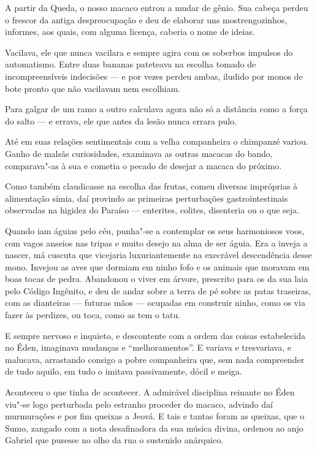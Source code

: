 A partir da Queda, o nosso macaco entrou a mudar de gênio. Sua cabeça
perdeu o frescor da antiga despreocupação e deu de elaborar uns
mostrengozinhos, informes, aos quais, com alguma licença, caberia o nome
de ideias.

Vacilava, ele que nunca vacilara e sempre agira com os soberbos impulsos
do automatismo. Entre duas bananas pateteava na escolha tomado de
incompreensíveis indecisões --- e por vezes perdeu ambas, iludido por
monos de bote pronto que não vacilavam nem escolhiam.

Para galgar de um ramo a outro calculava agora não só a distância como a
força do salto --- e errava, ele que antes da lesão nunca errara pulo.

Até em suas relações sentimentais com a velha companheira o chimpanzé
variou. Ganho de malsãs curiosidades, examinava as outras macacas do
bando, comparava"-as à sua e cometia o pecado de desejar a macaca do
próximo.

Como também claudicasse na escolha das frutas, comeu diversas impróprias
à alimentação símia, daí provindo as primeiras perturbações
gastrointestinais observadas na higidez do Paraíso --- enterites,
colites, disenteria ou o que seja.

Quando iam águias pelo céu, punha"-se a contemplar os seus harmoniosos
voos, com vagos anseios nas tripas e muito desejo na alma de ser águia.
Era a inveja a nascer, má cuscuta que vicejaria luxuriantemente na
execrável descendência desse mono. Invejou as aves que dormiam em ninho
fofo e os animais que moravam em boas tocas de pedra. Abandonou o viver
em árvore, prescrito para os da sua laia pelo Código Ingênito, e deu de
andar sobre a terra de pé sobre as patas traseiras, com as dianteiras
--- futuras mãos --- ocupadas em construir ninho, como os via fazer às
perdizes, ou toca, como as tem o tatu.

E sempre nervoso e inquieto, e descontente com a ordem das coisas
estabelecida no Éden, imaginava mudanças e ``melhoramentos''. E variava
e tresvariava, e malucava, arrastando consigo a pobre companheira que,
sem nada compreender de tudo aquilo, em tudo o imitava passivamente,
dócil e meiga.

Aconteceu o que tinha de acontecer. A admirável disciplina reinante no
Éden viu"-se logo perturbada pelo estranho proceder do macaco, advindo
daí murmurações e por fim queixas a Jeová. E tais e tantas foram as
queixas, que o Sumo, zangado com a nota desafinadora da sua música
divina, ordenou ao anjo Gabriel que pusesse no olho da rua o sustenido
anárquico.

